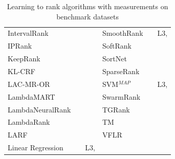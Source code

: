 \documentclass{sig-alternate}
\begin{document}
\begin{table}[!hpt]
{\begin{tabular}{lll|lll}
IntervalRank & \cite{Moon2010} & \cite{Moon2010, Freno2011} & SmoothRank & \cite{Chapelle2010} & L3, \cite{Chapelle2010} \\
IPRank & \cite{Wang2009b} & \cite{Wang2009b, Torkestani2012} & SoftRank & \cite{Taylor2008, Guiver2008} & \cite{Qin2010b} \\ 
KeepRank & \cite{Chen2009} & \cite{Chen2009} & SortNet & \cite{Rigutini2008} & \cite{Rigutini2008,Freno2011, Papini2012} \\
KL-CRF & \cite{Volkovs2011} & \cite{Volkovs2011} & SparseRank & \cite{Lai2013b} & \cite{Lai2013b} \\ 
LAC-MR-OR & \cite{Veloso2008} & \cite{Veloso2008, Alcantara2010} & SVM$^{MAP}$ & \cite{Yue2007} & L3, \cite{Wang2012, Xu2008, Niu2012} \\ 
LambdaMART & \cite{Burges2010} & \cite{Asadi2013a, Ganjisaffar2011c} &SwarmRank & \cite{Diaz-Aviles2009} & \cite{Sato2013} \\ 
LambdaNeuralRank & \cite{Papini2012} & \cite{Papini2012} & TGRank & \cite{Lai2013} & \cite{Lai2013} \\ 
LambdaRank & \cite{Burges2006} & \cite{Papini2012, Tan2013} & TM & \cite{Zhou2008} & \cite{Zhou2008, Papini2012, Tan2013} \\ 
LARF & \cite{Torkestani2012} & \cite{Torkestani2012} &  VFLR & \cite{Cai2012} & \cite{Cai2012} \\
Linear Regression & \cite{Cossock2006} & L3, \cite{Wang2012, Volkovs2011} & & & \\
\bottomrule
\end{tabular}
\caption{Learning to rank algorithms with measurements on benchmark datasets}}
\label{tab:ltr_methods_used}
\end{table}
\end{document}
